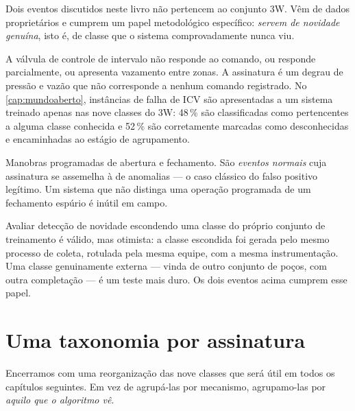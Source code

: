 Dois eventos discutidos neste livro não pertencem ao conjunto 3W. Vêm de dados
proprietários e cumprem um papel metodológico específico: \emph{servem de novidade
genuína}, isto é, de classe que o sistema comprovadamente nunca viu.

\begin{description}[leftmargin=0pt,style=nextline,itemsep=0.5em]

\item[Falha de ICV.] A válvula de controle de intervalo não responde ao comando, ou
responde parcialmente, ou apresenta vazamento entre zonas. A assinatura é um degrau de
pressão e vazão que não corresponde a nenhum comando registrado. No
\cref{cap:mundoaberto}, instâncias de falha de ICV são apresentadas a um sistema
treinado apenas nas nove classes do 3W: 48\,\% são classificadas como pertencentes a
alguma classe conhecida e 52\,\% são corretamente marcadas como desconhecidas e
encaminhadas ao estágio de agrupamento.

\item[Operação de válvula.] Manobras programadas de abertura e fechamento. São
\emph{eventos normais} cuja assinatura se assemelha à de anomalias --- o caso clássico
do falso positivo legítimo. Um sistema que não distinga uma operação programada de um
fechamento espúrio é inútil em campo.

\end{description}

\begin{destaque}
Avaliar detecção de novidade escondendo uma classe do próprio conjunto de treinamento é
válido, mas otimista: a classe escondida foi gerada pelo mesmo processo de coleta,
rotulada pela mesma equipe, com a mesma instrumentação. Uma classe genuinamente externa
--- vinda de outro conjunto de poços, com outra completação --- é um teste mais duro.
Os dois eventos acima cumprem esse papel.
\end{destaque}

\section{Uma taxonomia por assinatura}

Encerramos com uma reorganização das nove classes que será útil em todos os capítulos
seguintes. Em vez de agrupá-las por mecanismo, agrupamo-las por \emph{aquilo que o
algoritmo vê}.

